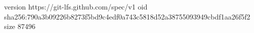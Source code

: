 version https://git-lfs.github.com/spec/v1
oid sha256:790a3b09226b8273f5bd9c4edf0a743c5818d52a38755093949cbdf1aa26f5f2
size 87496
